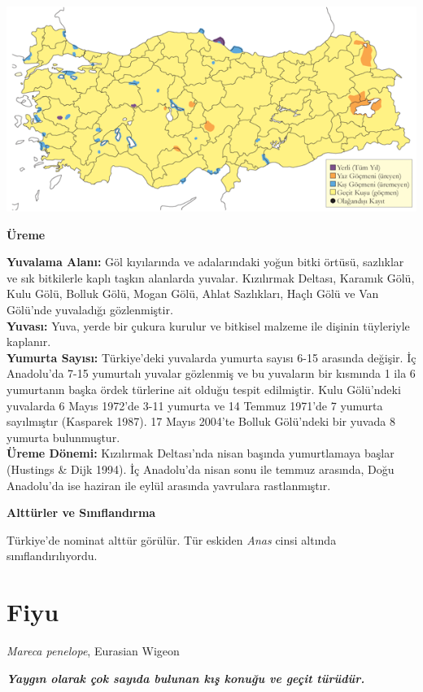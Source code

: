 \documentclass[
  letterpaper,
  DIV=11,
  numbers=noendperiod]{scrreprt}
\begin{document}
\includegraphics{images/harita_Page_014.png}

\textbf{Üreme}

\textbf{Yuvalama Alanı:} Göl kıyılarında ve adalarındaki yoğun bitki
örtüsü, sazlıklar ve sık bitkilerle kaplı taşkın alanlarda yuvalar.
Kızılırmak Deltası, Karamık Gölü, Kulu Gölü, Bolluk Gölü, Mogan Gölü,
Ahlat Sazlıkları, Haçlı Gölü ve Van Gölü'nde yuvaladığı gözlenmiştir.\\
\textbf{Yuvası:} Yuva, yerde bir çukura kurulur ve bitkisel malzeme ile
dişinin tüyleriyle kaplanır.\\
\textbf{Yumurta Sayısı:} Türkiye'deki yuvalarda yumurta sayısı 6-15
arasında değişir. İç Anadolu'da 7-15 yumurtalı yuvalar gözlenmiş ve bu
yuvaların bir kısmında 1 ila 6 yumurtanın başka ördek türlerine ait
olduğu tespit edilmiştir. Kulu Gölü'ndeki yuvalarda 6 Mayıs 1972'de 3-11
yumurta ve 14 Temmuz 1971'de 7 yumurta sayılmıştır (Kasparek 1987). 17
Mayıs 2004'te Bolluk Gölü'ndeki bir yuvada 8 yumurta bulunmuştur.\\
\textbf{Üreme Dönemi:} Kızılırmak Deltası'nda nisan başında yumurtlamaya
başlar (Hustings \& Dijk 1994). İç Anadolu'da nisan sonu ile temmuz
arasında, Doğu Anadolu'da ise haziran ile eylül arasında yavrulara
rastlanmıştır.

\textbf{Alttürler ve Sınıflandırma}

Türkiye'de nominat alttür görülür. Tür eskiden \emph{Anas} cinsi altında
sınıflandırılıyordu.

\section{Fiyu}\label{fiyu}

\emph{Mareca penelope}, Eurasian Wigeon

\textbf{\emph{Yaygın olarak çok sayıda bulunan kış konuğu ve geçit
türüdür.}}
\end{document}

